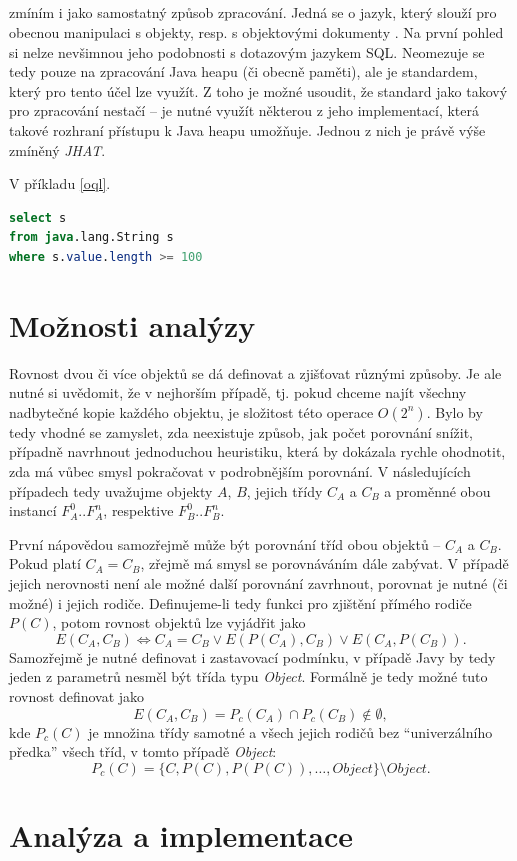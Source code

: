 \section{}
 zmíním i jako samostatný způsob zpracování. Jedná se o jazyk, který slouží pro obecnou manipulaci s objekty, resp. s objektovými dokumenty \cite{odmgoql}\cite{oql}. Na první pohled si nelze nevšimnou jeho podobnosti s dotazovým jazykem SQL. Neomezuje se tedy pouze na zpracování Java heapu (či obecně paměti), ale je standardem, který pro tento účel lze využít. Z toho je možné usoudit, že standard jako takový pro zpracování nestačí -- je nutné využít některou z jeho implementací, která takové rozhraní přístupu k Java heapu umožňuje. Jednou z nich je právě výše zmíněný \textit{JHAT}.

V příkladu \ref{oql}.

\begin{lstlisting}[caption={Příklad OQL}, label={oql}, frame={single}, language={SQL}]
select s 
from java.lang.String s 
where s.value.length >= 100
\end{lstlisting}






\chapter{Možnosti analýzy}
Rovnost dvou či více objektů se dá definovat a zjišťovat různými způsoby. Je ale nutné si uvědomit, že v nejhorším případě, tj. pokud chceme najít všechny nadbytečné kopie každého objektu, je složitost této operace $O(2^n)$. Bylo by tedy vhodné se zamyslet, zda neexistuje způsob, jak počet porovnání snížit, případně navrhnout jednoduchou heuristiku, která by dokázala rychle ohodnotit, zda má vůbec smysl pokračovat v podrobnějším porovnání. V následujících případech tedy uvažujme objekty $A$, $B$, jejich třídy $C_A$ a $C_B$ a proměnné obou instancí $F_A^0..F_A^n$, respektive $F_B^0..F_B^n$.

První nápovědou samozřejmě může být porovnání tříd obou objektů -- $C_A$ a $C_B$. Pokud platí $C_A = C_B$, zřejmě má smysl se porovnáváním dále zabývat. V případě jejich nerovnosti není ale možné další porovnání zavrhnout, porovnat je nutné (či možné) i jejich rodiče. Definujeme-li tedy funkci pro zjištění přímého rodiče $P(C)$, potom rovnost objektů lze vyjádřit jako
    $$ E(C_A, C_B) \Leftrightarrow C_A = C_B \vee E(P(C_A), C_B) \vee E(C_A, P(C_B)).$$    
Samozřejmě je nutné definovat i zastavovací podmínku, v případě Javy by tedy jeden z parametrů nesměl být třída typu \textit{Object}. Formálně je tedy možné tuto rovnost definovat jako
	$$ E(C_A, C_B) = P_c(C_A) \cap P_c(C_B) \notin \emptyset,$$
kde $P_c(C)$ je množina třídy samotné a všech jejich rodičů bez “univerzálního předka” všech tříd, v tomto případě \textit{Object}:
	$$ P_c(C) = \{C, P(C), P(P(C)), \dots, Object\} \setminus Object. $$


\chapter{Analýza a implementace}
